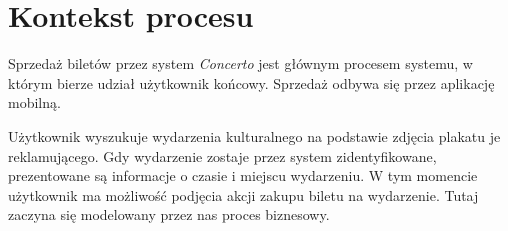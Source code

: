 \section{Kontekst procesu}

Sprzedaż biletów przez system \emph{Concerto} jest głównym procesem systemu, w
którym bierze udział użytkownik końcowy. Sprzedaż odbywa się przez aplikację
mobilną.

Użytkownik wyszukuje wydarzenia kulturalnego na podstawie zdjęcia plakatu je
reklamującego. Gdy wydarzenie zostaje przez system zidentyfikowane, prezentowane
są informacje o czasie i miejscu wydarzeniu. W tym momencie użytkownik ma
możliwość podjęcia akcji zakupu biletu na wydarzenie. Tutaj zaczyna się
modelowany przez nas proces biznesowy.
